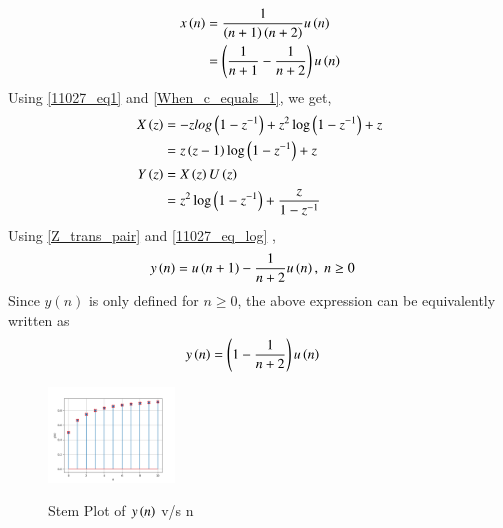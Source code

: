 \documentclass[journal,12pt,twocolumn]{IEEEtran}
\theoremstyle{remark}
\begin{document}
\solution
\begin{table}[ht]

\end{table}
\begin{align}
x\left(n\right) &= \frac{1}{\left(n+1\right)\left(n+2\right)}u\left(n\right)\\
& = \left(\frac{1}{n+1} - \frac{1}{n+2}\right)u\left(n\right)
\end{align}
Using \eqref{11027_eq1} and \eqref{When_c_equals_1}, we get,
\begin{align}X\left(z\right) &= -z log\left(1-z^{-1}\right) + z^2 \log\left(1-z^{-1}\right) + z\\
&= z\left(z-1\right)\log\left(1-z^{-1}\right) + z\\
    Y\left(z\right) &= X\left(z\right)U\left(z\right)\\
     &=z^2\log\left(1-z^{-1}\right) + \frac{z}{1-z^{-1}}
\end{align}
Using \eqref{Z_trans_pair} and \eqref{11027_eq_log} ,
\begin{align}
    y\left(n\right) &= u\left(n+1\right) - \frac{1}{n+2}u\left(n\right) , \; n \geq 0
\end{align}
Since $y(n)$ is only defined for $n \geq 0$, the above expression can be equivalently written as
\begin{align}
	y\left(n\right) &= \left(1-\frac{1}{n+2}\right) u\left(n\right)
\end{align}
\newpage
\begin{figure}[h]
    \includegraphics[width=0.3\textwidth]{figs/y(n)_vs_n.png}\label{fig:stem-plot}
    \caption{Stem Plot of $y\left(n\right)$ v/s n}
\end{figure}
\end{document}
